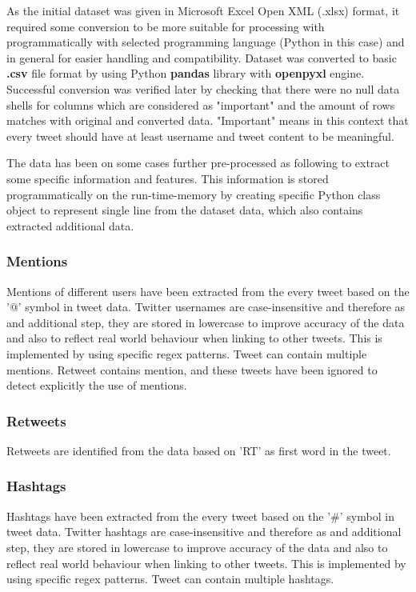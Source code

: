\documentclass[conference]{IEEEtran}
\begin{document}
    As the initial dataset was given in Microsoft Excel Open XML (.xlsx) format, it required some conversion to be more suitable for processing with
    programmatically with selected programming language (Python in this case) and in general for easier handling and compatibility.
    Dataset was converted to basic \textbf{.csv} file format by using Python \textbf{pandas}\cite{mckinney2010data} library with \textbf{openpyxl}\cite{openpyxl} engine.
    Successful conversion was verified later by checking that there were no null data shells for columns which are considered as "important" and the amount of rows matches with original and converted data.
    "Important" means in this context that every tweet should have at least username and tweet content to be meaningful.

    The data has been on some cases further pre-processed as following to extract some specific information and features.
    This information is stored programmatically on the run-time-memory by creating specific Python class object to represent single line from the dataset data, which also contains extracted additional data.

    \subsubsection{Mentions}

    Mentions of different users have been extracted from the every tweet based on the '@' symbol in tweet data.
    Twitter usernames are case-insensitive and therefore as and additional step, they are stored in lowercase to improve accuracy of the data and also to reflect real world behaviour when linking to other tweets.
    This is implemented by using specific regex patterns.
    Tweet can contain multiple mentions.
    Retweet contains mention, and these tweets have been ignored to detect explicitly the use of mentions.

    \subsubsection{Retweets}

    Retweets are identified from the data based on 'RT' as first word in the tweet.

    \subsubsection{Hashtags}

    Hashtags have been extracted from the every tweet based on the '\#' symbol in tweet data.
    Twitter hashtags are case-insensitive and therefore as and additional step, they are stored in lowercase to improve accuracy of the data and also to reflect real world behaviour when linking to other tweets.
    This is implemented by using specific regex patterns. Tweet can contain multiple hashtags.
\end{document}
